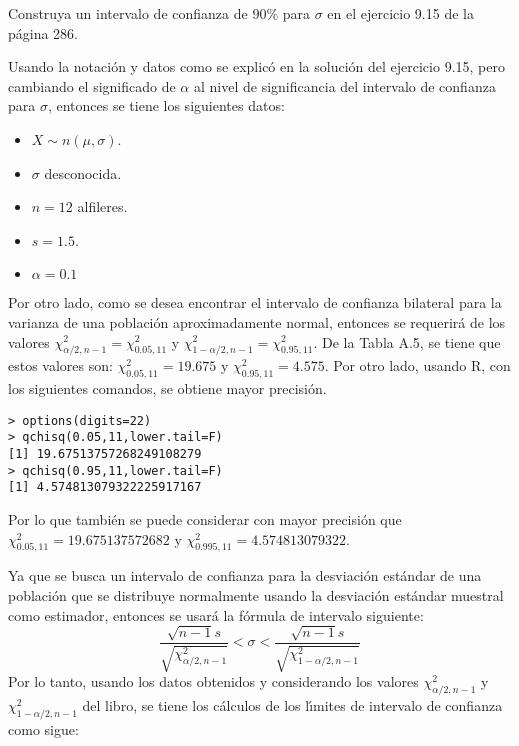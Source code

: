 \begin{enunciado}
 Construya un intervalo de confianza de $90\%$ para $\sigma$ en el ejercicio 9.15 de la p\'agina 286.
\end{enunciado}

\begin{solucion}
 Usando la notaci\'on y datos como se explic\'o en la soluci\'on del ejercicio 9.15, pero cambiando el significado de $\alpha$ al nivel de significancia del intervalo de confianza para $\sigma$, entonces se tiene los siguientes datos:
 \begin{itemize}
  \item $X \sim n(\mu, \sigma)$.
  \item $\sigma$ desconocida.
  \item $n = 12$ alfileres.
  \item $s = 1.5$.
  \item $\alpha = 0.1$
 \end{itemize}
 Por otro lado, como se desea encontrar el intervalo de confianza bilateral para la varianza de una poblaci\'on aproximadamente normal, entonces se requerir\'a de los valores $\chi^2_{\alpha/2,n-1} = \chi^2_{0.05,11}$ y $\chi^2_{1-\alpha/2,n-1} = \chi^2_{0.95,11}$. De la Tabla A.5, se tiene que estos valores son: $\chi^2_{0.05,11} = 19.675$ y $\chi^2_{0.95,11} = 4.575$. Por otro lado, usando R, con los siguientes comandos, se obtiene mayor precisi\'on.
 \begin{verbatim}
> options(digits=22)
> qchisq(0.05,11,lower.tail=F)
[1] 19.67513757268249108279
> qchisq(0.95,11,lower.tail=F)
[1] 4.574813079322225917167
 \end{verbatim}
 \vspace{-0.5cm}
 Por lo que tambi\'en se puede considerar con mayor precisi\'on que $\chi^2_{0.05,11} = 19.675137572682$ y $\chi^2_{0.995,11} = 4.574813079322$.
 \par 
 Ya que se busca un intervalo de confianza para la desviaci\'on est\'andar de una poblaci\'on que se distribuye normalmente usando la desviaci\'on est\'andar muestral como estimador, entonces se usar\'a la f\'ormula de intervalo siguiente:
 \begin{equation*}
  \frac{\sqrt{n-1}s}{\sqrt{\chi^2_{\alpha/2,n-1}}} < \sigma < \frac{\sqrt{n-1}s}{\sqrt{\chi^2_{1-\alpha/2,n-1}}}
 \end{equation*}
 Por lo tanto, usando los datos obtenidos y considerando los valores $\chi^2_{\alpha/2,n-1}$ y $\chi^2_{1-\alpha/2,n-1}$ del libro, se tiene los c\'alculos de los l\'{\i}mites de intervalo de confianza como sigue:

\end{solucion}
